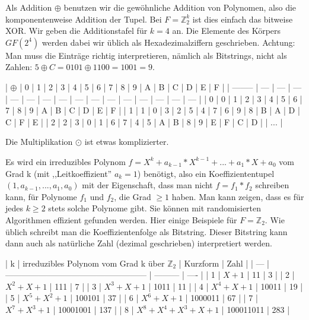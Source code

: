 \documentclass[a4paper]{article}
\begin{document}
\begin{multicols}{3}
    Als Addition $\oplus$ benutzen wir die gewöhnliche Addition von Polynomen, also die komponentenweise Addition der Tupel. Bei $F=\mathbb{Z}^k_2$ ist dies einfach das bitweise XOR. Wir geben die Additionstafel für $k=4$ an. Die Elemente des Körpers $GF(2^4)$ werden dabei wir üblich als Hexadezimalziffern geschrieben. Achtung: Man muss die Einträge richtig interpretieren, nämlich als Bitstrings, nicht als Zahlen: $5\oplus C=0101\oplus 1100=1001=9$.

    | $\oplus$ | 0   | 1   | 2   | 3   | 4   | 5   | 6   | 7   | 8   | 9   | A   | B   | C   | D   | E   | F |
    | -------- | --- | --- | --- | --- | --- | --- | --- | --- | --- | --- | --- | --- | --- | --- | --- |
    | 0        | 0   | 1   | 2   | 3   | 4   | 5   | 6   | 7   | 8   | 9   | A   | B   | C   | D   | E   | F |
    | 1        | 1   | 0   | 3   | 2   | 5   | 4   | 7   | 6   | 9   | 8   | B   | A   | D   | C   | F   | E |
    | 2        | 2   | 3   | 0   | 1   | 6   | 7   | 4   | 5   | A   | B   | 8   | 9   | E   | F   | C   | D |
    | ...      |

    Die Multiplikation $\odot$ ist etwas komplizierter.

    Es wird ein irreduzibles Polynom $f=X^k+a_{k-1}* X^{k-1}+...+a_1*X+a_0$ vom Grad k (mit ,,Leitkoeffizient'' $a_k=1$) benötigt, also ein Koeffiziententupel $(1,a_{k-1},...,a_1,a_0)$ mit der Eigenschaft, dass man nicht $f=f_1*f_2$ schreiben kann, für Polynome $f_1$ und $f_2$, die Grad $\geq 1$ haben. Man kann zeigen, dass es für jedes $k\geq 2$ stets solche Polynome gibt. Sie können mit randomisierten Algorithmen effizient gefunden werden. Hier einige Beispiele für $F=\mathbb{Z}_2$. Wie üblich schreibt man die Koeffizientenfolge als Bitstring. Dieser Bitstring kann dann auch als natürliche Zahl (dezimal geschrieben) interpretiert werden.

    | k   | irreduzibles Polynom vom Grad k über $\mathbb{Z}_2$ | Kurzform  | Zahl |
    | --- | --------------------------------------------------- | --------- | ---- |
    | 1   | $X+ 1$                                              | 11        | 3    |
    | 2   | $X^2 +X+ 1$                                         | 111       | 7    |
    | 3   | $X^3 +X+ 1$                                         | 1011      | 11   |
    | 4   | $X^4 +X+ 1$                                         | 10011     | 19   |
    | 5   | $X^5 +X^2 + 1$                                      | 100101    | 37   |
    | 6   | $X^6 +X+ 1$                                         | 1000011   | 67   |
    | 7   | $X^7 +X^3 + 1$                                      | 10001001  | 137  |
    | 8   | $X^8 +X^4 +X^3 +X+ 1$                               | 100011011 | 283  |


\end{multicols}
\end{document}
